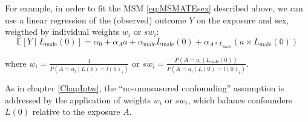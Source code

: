 \documentclass[
]{book}
\begin{document}
For example, in order to fit the MSM \eqref{eq:MSMATEsex} described above, we can use a linear regression of the (observed) outcome \(Y\) on the exposure and sex, weigthed by individual weights \(w_i\) or \(sw_i\):
\begin{equation} 
  \mathbb{E}\left[Y \mid L_\text{male}(0)\right] = \alpha_0 + \alpha_A a + \alpha_\text{male} L_\text{male}(0) + \alpha_{A \ast L_\text{male}} \left(a \times L_\text{male}(0)\right)
\end{equation}

where \(w_i=\frac{1}{P(A=a_i \mid L(0)=l(0)_i)}\) or \(sw_i=\frac{P(A=a_i \mid L_\text{male}(0))}{P(A=a_i \mid L(0)=l(0)_i)}\).

As in chapter \ref{ChapIptw}, the ``no-unmeasured confounding'' assumption is addressed by the application of weights \(w_i\) or \(sw_i\), which balance confounders \(L(0)\) relative to the exposure \(A\).
\end{document}
